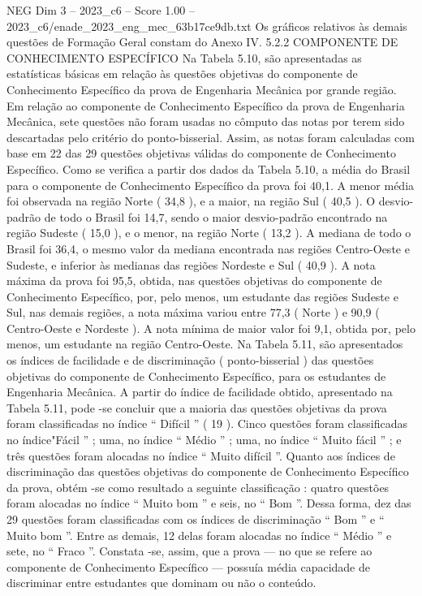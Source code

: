 \begin{textsample}{NEG Dim 3 – 2023\_c6 – Score 1.00 – 2023\_c6/enade\_2023\_eng\_mec\_63b17ce9db.txt}
Os gráficos relativos às demais questões de Formação Geral constam do Anexo IV. 5.2.2 COMPONENTE DE CONHECIMENTO ESPECÍFICO Na Tabela 5.10, são apresentadas as estatísticas básicas em relação às questões objetivas do componente de Conhecimento Específico da prova de Engenharia Mecânica por grande região.
Em relação ao componente de Conhecimento Específico da prova de Engenharia Mecânica, sete questões não foram usadas no cômputo das notas por terem sido descartadas pelo critério do ponto-bisserial.
Assim, as notas foram calculadas com base em 22 das 29 questões objetivas válidas do componente de Conhecimento Específico.
Como se verifica a partir dos dados da Tabela 5.10, a média do Brasil para o componente de Conhecimento Específico da prova foi 40,1.
A menor média foi observada na região Norte ( 34,8 ), e a maior, na região Sul ( 40,5 ).
O desvio-padrão de todo o Brasil foi 14,7, sendo o maior desvio-padrão encontrado na região Sudeste ( 15,0 ), e o menor, na região Norte ( 13,2 ).
A mediana de todo o Brasil foi 36,4, o mesmo valor da mediana encontrada nas regiões Centro-Oeste e Sudeste, e inferior às medianas das regiões Nordeste e Sul ( 40,9 ).
A nota máxima da prova foi 95,5, obtida, nas questões objetivas do componente de Conhecimento Específico, por, pelo menos, um estudante das regiões Sudeste e Sul, nas demais regiões, a nota máxima variou entre 77,3 ( Norte ) e 90,9 ( Centro-Oeste e Nordeste ).
A nota mínima de maior valor foi 9,1, obtida por, pelo menos, um estudante na região Centro-Oeste.
Na Tabela 5.11, são apresentados os índices de facilidade e de discriminação ( ponto-bisserial ) das questões objetivas do componente de Conhecimento Específico, para os estudantes de Engenharia Mecânica.
A partir do índice de facilidade obtido, apresentado na Tabela 5.11, pode -se concluir que a maioria das questões objetivas da prova foram classificadas no índice “ Difícil ” ( 19 ).
Cinco questões foram classificadas no índice"Fácil ” ; uma, no índice “ Médio ” ; uma, no índice “ Muito fácil ” ; e três questões foram alocadas no índice “ Muito difícil ”.
Quanto aos índices de discriminação das questões objetivas do componente de Conhecimento Específico da prova, obtém -se como resultado a seguinte classificação : quatro questões foram alocadas no índice “ Muito bom ” e seis, no “ Bom ”.
Dessa forma, dez das 29 questões foram classificadas com os índices de discriminação “ Bom ” e “ Muito bom ”.
Entre as demais, 12 delas foram alocadas no índice “ Médio ” e sete, no “ Fraco ”.
Constata -se, assim, que a prova — no que se refere ao componente de Conhecimento Específico — possuía média capacidade de discriminar entre estudantes que dominam ou não o conteúdo.

\end{textsample}

